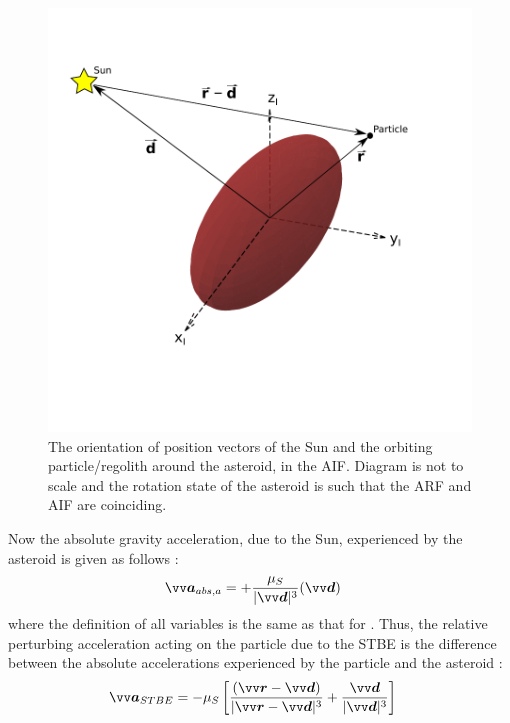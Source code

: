 \begin{figure}[htb]
\centering
\captionsetup{justification=centering}
\includegraphics[width=\textwidth, height=0.35\textheight, keepaspectratio=true]{stbe_bodyframe_edit_2.pdf}
\caption{The orientation of position vectors of the Sun and the orbiting particle/regolith around the asteroid, in the \gls{AIF}. Diagram is not to scale and the rotation state of the asteroid is such that the \gls{ARF} and \gls{AIF} are coinciding.}
\label{fig:stbe_inertialFrame}
\end{figure}
\FloatBarrier
Now the absolute gravity acceleration, due to the Sun, experienced by the asteroid is given as follows \parencite{scheeresBook}:
\begin{align}
    \bv{a}_{abs, a} &= +\frac{\mu_S}{|\bv{d}|^3} (\bv{d})
    \label{eqn:stbe_asteroid_abs_acc}
\end{align}
where the definition of all variables is the same as that for . Thus, the relative perturbing acceleration acting on the particle due to the \gls{STBE} is the difference between the absolute accelerations experienced by the particle and the asteroid \parencite{scheeresBook}:
\begin{align}
    \bv{a}_{STBE} &= -\mu_S \left[ \frac{(\bv{r} - \bv{d})}{|\bv{r} - \bv{d}|^3} + \frac{\bv{d}}{|\bv{d}|^3} \right]
    \label{eqn:stbe_acc}
\end{align}
